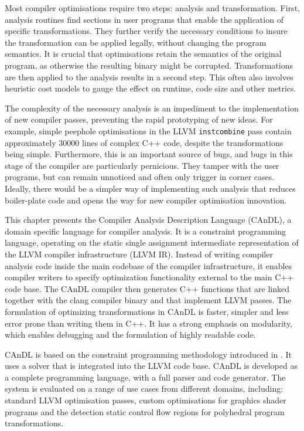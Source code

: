     Most compiler optimisations require two steps:
    analysis and transformation.
    First, analysis routines find sections in user programs that enable the
    application of specific transformations.
    They further verify the necessary conditions to insure the transformation
    can be applied legally, without changing the program semantics.
    It is crucial that optimisations retain the semantics of the original
    program, as otherwise the resulting binary might be corrupted.
    Transformations are then applied to the analysis results in a second step.
    This often also involves heuristic cost models to gauge the effect on
    runtime, code size and other metrics.

    The complexity of the necessary analysis is an impediment to
    the implementation of new compiler passes, preventing the rapid
    prototyping of new ideas.
    For example, simple peephole optimisations in the LLVM {\tt instcombine}
    pass contain approximately 30000 lines of complex C++ code, despite the
    transformations being simple.
    Furthermore, this is an important source of bugs, and bugs in this stage of
    the compiler are particularly pernicious.
    They tamper with the user programs, but can remain unnoticed and often only
    trigger in corner cases.
    Ideally, there would be a simpler way of implementing such analysis that
    reduces boiler-plate code and opens the way for new compiler optimisation
    innovation.

    This chapter presents the Compiler Analysis Description Language (CAnDL), a
    domain specific language for compiler analysis.
    It is a constraint programming language, operating on the static single
    assignment intermediate representation of the LLVM compiler infrastructure
    (LLVM IR).
    Instead of writing compiler analysis code inside the main codebase of the
    compiler infrastructure, it enables compiler writers to specify optimization
    functionality external to the main C++ code base.
    The CAnDL compiler then generates C++ functions that are linked together
    with the clang compiler binary and that implement LLVM passes.
    The formulation of optimizing transformations in CAnDL is faster, simpler
    and less error prone than writing them in C++.
    It has a strong emphasis on modularity, which enables debugging and the
    formulation of highly readable code.

    CAnDL is based on the constraint programming methodology introduced in
    .
    It uses a solver that is integrated into the LLVM code base.
    CAnDL is developed as a complete programming language, with a full parser
    and code generator.
    The system is evaluated on a range of use cases from
    different domains, including: standard LLVM optimisation passes,
    custom optimisations for graphics shader programs and the detection static
    control flow regions for polyhedral program transformations.

